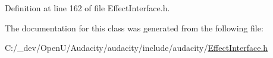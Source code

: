 Definition at line 162 of file Effect\+Interface.\+h.



The documentation for this class was generated from the following file\+:\begin{DoxyCompactItemize}
\item 
C\+:/\+\_\+dev/\+Open\+U/\+Audacity/audacity/include/audacity/\hyperlink{_effect_interface_8h}{Effect\+Interface.\+h}\end{DoxyCompactItemize}
